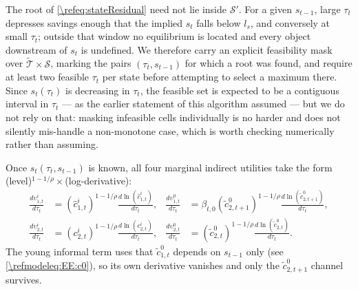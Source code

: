 \documentclass[a4paper]{article}
\begin{document}
The root of \eqref{\refeq:stateResidual} need not lie inside $\mathcal{S}'$. For a given $s_{t-1}$, large $\tau_t$ depresses savings enough that the implied $s_t$ falls below $l_s$, and conversely at small $\tau_t$; outside that window no equilibrium is located and every object downstream of $s_t$ is undefined. We therefore carry an explicit feasibility mask over $\tilde{\mathcal{T}}\times\mathcal{S}$, marking the pairs $(\tau_t, s_{t-1})$ for which a root was found, and require at least two feasible $\tau_t$ per state before attempting to select a maximum there. Since $s_t(\tau_t)$ is decreasing in $\tau_t$, the feasible set is expected to be a contiguous interval in $\tau_t$ --- as the earlier statement of this algorithm assumed --- but we do not rely on that: masking infeasible cells individually is no harder and does not silently mis-handle a non-monotone case, which is worth checking numerically rather than assuming.

Once $s_t(\tau_t,s_{t-1})$ is known, all four marginal indirect utilities take the form (level)$^{1-1/\rho}\times$(log-derivative):
\begin{subequations}\label{\refeq:PEEcrraTerms}
\begin{align}
    \frac{d\upsilon_{1,t}^i}{d\tau_t} &= \left(\hat{c}_{1,t}^i\right)^{1-1/\rho}\frac{d\ln\left(\hat{c}_{1,t}^i\right)}{d\tau_t}, &
    \frac{d\upsilon_{1,t}^0}{d\tau_t} &= \beta_{t,0}\left(\tilde{c}_{2,t+1}^0\right)^{1-1/\rho}\frac{d\ln\left(\tilde{c}_{2,t+1}^0\right)}{d\tau_t}, \\
    \frac{d\upsilon_{2,t}^i}{d\tau_t} &= \left(c_{2,t}^i\right)^{1-1/\rho}\frac{d\ln\left(c_{2,t}^i\right)}{d\tau_t}, &
    \frac{d\upsilon_{2,t}^0}{d\tau_t} &= \left(\tilde{c}_{2,t}^0\right)^{1-1/\rho}\frac{d\ln\left(\tilde{c}_{2,t}^0\right)}{d\tau_t}.
\end{align}
\end{subequations}
The young informal term uses that $\tilde{c}_{1,t}^0$ depends on $s_{t-1}$ only (see \eqref{\refmodeleq:EE:c0}), so its own derivative vanishes and only the $\tilde{c}_{2,t+1}^0$ channel survives.
\end{document}
